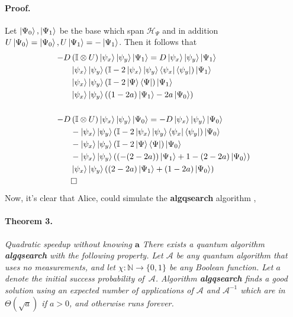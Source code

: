 \documentclass{article}
\begin{document}
\begin{multicols*}{2}
\paragraph{Proof.} Let $\ket{\Psi_0}, \ket{\Psi_1}$ be the base which span $ \mathcal{H}_{\Psi}$ and in addition $U\ket{\Psi_0} = \ket{\Psi_0}, U\ket{\Psi_1} =- \ket{\Psi_1}$.
    Then it follows that   
    \begin{equation*}
      \begin{split}
    - D & \left( \mathbb{I} \otimes U \right)  \ket{\psi_{x}}\ket{\psi_{y}} \ket{\Psi_1} =    D  \ket{\psi_{x}}\ket{\psi_{y}} \ket{\Psi_1} \\
  &  \ket{\psi_{x}}\ket{\psi_{y}} \left( \mathbb{I} - 2 \ket{\psi_{x}}\ket{\psi_{y}} \bra{ \psi_{x}}\bra{\psi_{y}} \right) \ket{\Psi_1} \\
  &  \ket{\psi_{x}}\ket{\psi_{y}} \left( \mathbb{I} - 2 \ket{\Psi} \bra{\Psi} \right) \ket{\Psi_1}  \\ 
  &  \ket{\psi_{x}}\ket{\psi_{y}} \left( \left( 1 - 2a  \right)\ket{\Psi_1} - 2a \ket{\Psi_0} \right) \\ 
  & \\ 
  - D & \left( \mathbb{I} \otimes U \right)  \ket{\psi_{x}}\ket{\psi_{y}} \ket{\Psi_0} =   - D  \ket{\psi_{x}}\ket{\psi_{y}} \ket{\Psi_0} \\
  &  - \ket{\psi_{x}}\ket{\psi_{y}} \left( \mathbb{I} - 2 \ket{\psi_{x}}\ket{\psi_{y}} \bra{ \psi_{x}}\bra{\psi_{y}} \right) \ket{\Psi_0} \\
  &  - \ket{\psi_{x}}\ket{\psi_{y}} \left( \mathbb{I} - 2 \ket{\Psi} \bra{\Psi} \right) \ket{\Psi_0} \\ 
  &  - \ket{\psi_{x}}\ket{\psi_{y}} \left( \left(  - (2-2a)  \right)\ket{\Psi_1} + 1 -(2 - 2a) \ket{\Psi_0} \right) \\ 
  & \ket{\psi_{x}}\ket{\psi_{y}} \left( \left( 2-2a \right)\ket{\Psi_1} + \left(1  - 2a\right) \ket{\Psi_0} \right) \\ 
  & \square
\end{split}
\end{equation*}
Now, it's clear that Alice, could simulate the \textbf{algqsearch} algorithm \cite{Brassard_2002}, 

\paragraph{Theorem 3.} \textit{Quadratic speedup without knowing $\mathbf{a}$
There exists a quantum algorithm \textbf{algqsearch} with the following property.
Let $\mathcal A$ be any quantum algorithm that uses no measurements,
and let $\chi : \mathbb{N}  \rightarrow \{0,1\}$ be any Boolean function.
Let $a$ denote the initial success probability of~$\mathcal A$.
Algorithm \textbf{algqsearch} finds a good solution using an expected number
of applications of $\mathcal A$ and ${\mathcal A}^{-1}$ which are in
$\Theta(\sqrt a)$ if $a>0$, and otherwise runs forever.}


\end{multicols*}
\end{document}
